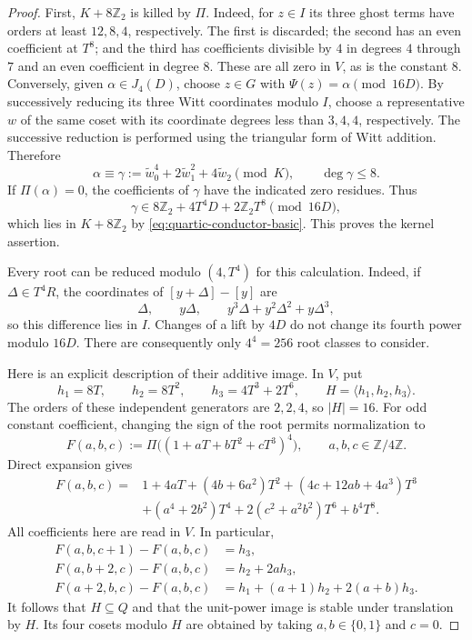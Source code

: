 \documentclass[11pt]{amsart}
\theoremstyle{definition}
\numberwithin{equation}{section}
\begin{document}
\begin{proof}
First, $K+8\mathbb Z_2$ is killed by $\Pi$.  Indeed, for $z\in I$
its three ghost terms have orders at least $12,8,4$, respectively.
The first is discarded; the second has an even coefficient at $T^8$;
and the third has coefficients divisible by $4$ in degrees $4$ through
$7$ and an even coefficient in degree $8$.  These are all zero in $V$,
as is the constant $8$.  Conversely, given
$\alpha\in J_4(D)$, choose $z\in G$ with $\Psi(z)=\alpha\pmod {16D}$.
By successively reducing its three Witt coordinates modulo $I$, choose
a representative $w$ of the same coset with its coordinate degrees
less than $3,4,4$, respectively.  The successive reduction is performed using the triangular form of Witt addition.  Therefore
\[
 \alpha\equiv\gamma:=\widetilde w_0^4+
                 2\widetilde w_1^2+4\widetilde w_2\pmod K,
 \qquad \deg\gamma\le8.
\]
If $\Pi(\alpha)=0$, the coefficients of $\gamma$ have the indicated
zero residues.  Thus
\[
 \gamma\in8\mathbb Z_2+4T^4D+2\mathbb Z_2T^8
       \pmod {16D},
\]
which lies in $K+8\mathbb Z_2$ by
\eqref{eq:quartic-conductor-basic}.  This proves the kernel assertion.

Every root can be reduced modulo $(4,T^4)$ for this calculation.
Indeed, if $\Delta\in T^4R$, the coordinates of
$[y+\Delta]-[y]$ are
\[
 \Delta,\qquad y\Delta,\qquad
 y^3\Delta+y^2\Delta^2+y\Delta^3,
\]
so this difference lies in $I$.  Changes of a lift by $4D$ do not
change its fourth power modulo $16D$.  There are consequently only
$4^4=256$ root classes to consider.

Here is an explicit description of their additive image.  In $V$, put
\[
 h_1=8T,\qquad h_2=8T^2,\qquad h_3=4T^3+2T^6,
 \qquad H=\langle h_1,h_2,h_3\rangle.
\]
The orders of these independent generators are $2,2,4$, so $|H|=16$.
For odd constant coefficient, changing the sign of the root permits
normalization to
\[
 F(a,b,c):=\Pi\bigl((1+aT+bT^2+cT^3)^4\bigr),
 \qquad a,b,c\in\mathbb Z/4\mathbb Z.
\]
Direct expansion gives
\begin{align*}
 F(a,b,c)={}&1+4aT+(4b+6a^2)T^2
       +(4c+12ab+4a^3)T^3\\
 &+(a^4+2b^2)T^4+2(c^2+a^2b^2)T^6+b^4T^8.
\end{align*}
All coefficients here are read in $V$.  In particular,
\begin{align*}
 F(a,b,c+1)-F(a,b,c)&=h_3,\\
 F(a,b+2,c)-F(a,b,c)&=h_2+2a h_3,\\
 F(a+2,b,c)-F(a,b,c)&=h_1+(a+1)h_2+2(a+b)h_3.
\end{align*}
It follows that $H\subseteq Q$ and that the unit-power image is
stable under translation by $H$.  Its four cosets modulo $H$ are
obtained by taking $a,b\in\{0,1\}$ and $c=0$.


\end{proof}
\end{document}
